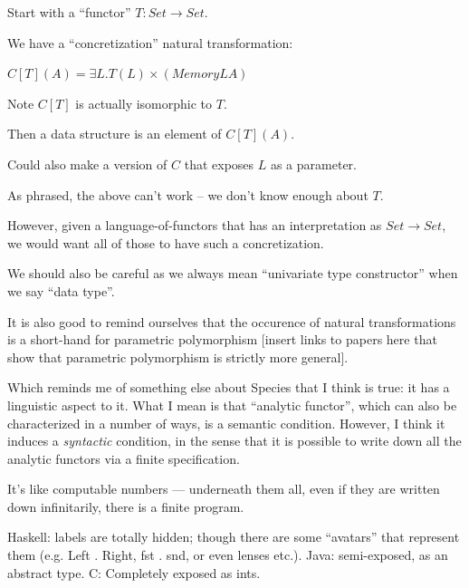 \documentclass{jfp}
\begin{document}
\begin{commentary}
  Start with a ``functor'' $T : Set \to Set$.

  We have a ``concretization'' natural transformation:

  $C[T](A) = \exists L. T(L) \times (Memory L A)$

  Note $C[T]$ is actually isomorphic to $T$.

  Then a data structure is an element of $C[T](A)$.

  Could also make a version of $C$ that exposes $L$ as a parameter.
\end{commentary}

\begin{commentary}
As phrased, the above can't work -- we don't know enough about $T$.

However, given a language-of-functors that has an interpretation
as $ Set \to Set $, we would want all of those to have such a
concretization.

We should also be careful as we always mean ``univariate type
constructor'' when we say ``data type''.

It is also good to remind ourselves that the occurence of
natural transformations is a short-hand for parametric
polymorphism [insert links to papers here that show that
parametric polymorphism is strictly more general].

\end{commentary}

\begin{commentary}
Which reminds me of something else about Species that I think
is true: it has a linguistic aspect to it.  What I mean is that
``analytic functor'', which can also be characterized in a number of
ways, is a semantic condition.  However, I think it induces a \emph{syntactic}
condition, in the sense that it is possible to write down all the
analytic functors via a finite specification.

It's like computable numbers --- underneath them all, even if they
are written down infinitarily, there is a finite program.
\end{commentary}

\begin{commentary}
  Haskell: labels are totally hidden; though there are some
  ``avatars'' that represent them (e.g. Left . Right, fst . snd, or
  even lenses etc.).  Java: semi-exposed, as an abstract type.  C:
  Completely exposed as ints.
\end{commentary}
\end{document}
